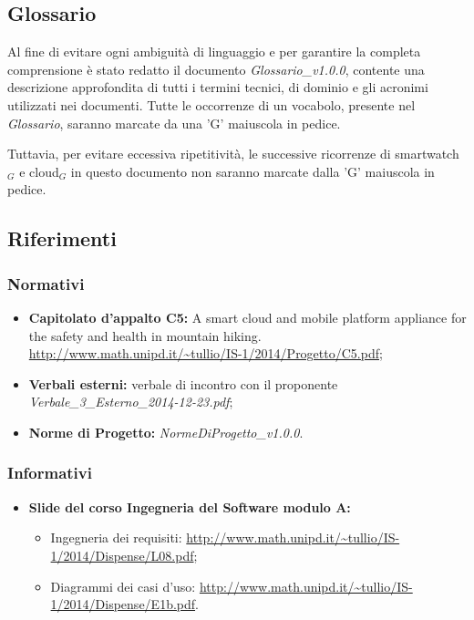 \subsection{Glossario}
Al fine di evitare ogni ambiguità di linguaggio e per garantire la completa comprensione è stato redatto il documento \textit{Glossario\_v1.0.0}, contente una descrizione approfondita di tutti i termini tecnici, di dominio e gli acronimi utilizzati nei documenti. Tutte le occorrenze di un vocabolo, presente nel \textit{Glossario}, saranno marcate da una 'G' maiuscola in pedice.

Tuttavia, per evitare eccessiva ripetitività, le successive ricorrenze di smartwatch$_{G}$ e cloud$_{G}$ in questo documento non saranno marcate dalla 'G' maiuscola in pedice.


\subsection{Riferimenti}
\subsubsection{Normativi}
\begin{itemize}
\item \textbf{Capitolato d'appalto C5:} \CAPITOLATO{} A smart cloud and mobile platform appliance for the safety and health in mountain hiking. \\
\url{http://www.math.unipd.it/~tullio/IS-1/2014/Progetto/C5.pdf};
\item \textbf{Verbali esterni:} verbale di incontro con il proponente {\itshape Verbale\_3\_Esterno\_2014-12-23.pdf}; 
\item \textbf{Norme di Progetto:} {\itshape NormeDiProgetto\_v1.0.0}.
\end{itemize} 

\subsubsection{Informativi}
\begin{itemize}
\item \textbf{Slide del corso Ingegneria del Software modulo A:}
\begin{itemize}
\item Ingegneria dei requisiti: \url{http://www.math.unipd.it/~tullio/IS-1/2014/Dispense/L08.pdf};
\item Diagrammi dei casi d'uso: \url{http://www.math.unipd.it/~tullio/IS-1/2014/Dispense/E1b.pdf}.
\end{itemize}
\end{itemize}

